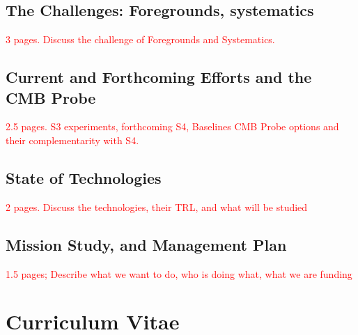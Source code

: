 \documentclass[12pt]{article}
\newcommand{\comred}[1]{\textcolor{red}{#1}}
\begin{document}
\vspace{-0.05in}

\subsection{The Challenges: Foregrounds, systematics}
\label{sec:foregrounds}

\vspace{-0.05in}

\comred{3 pages. Discuss the challenge of Foregrounds and Systematics. }
\subsection{Current and Forthcoming Efforts and the CMB Probe}
\label{sec:spacemission}

\vspace{-0.05in}

\comred{2.5 pages. S3 experiments, forthcoming S4, Baselines CMB Probe options and their complementarity with S4.}
\vspace{-0.22in}

\subsection{State of Technologies}
\label{sec:technologies}

\vspace{-0.05in}

\comred{2 pages. Discuss the technologies, their TRL, and what will be studied }

\vspace{-0.22in}

\subsection{Mission Study, and Management Plan  }
\label{sec:management}

\vspace{-0.05in}

\comred{1.5 pages; Describe what we want to do, who is doing what, what we are funding}

\newpage



\newpage
\section{Curriculum Vitae}
\label{sec:cv}
\end{document}
